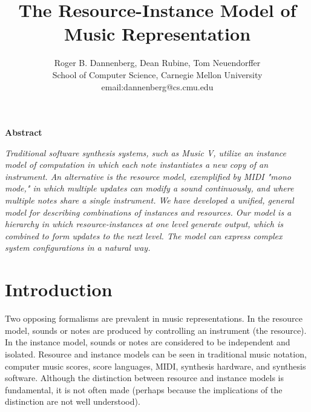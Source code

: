 \documentclass[10pt,a4paper]{article}
\begin{document}
\twocolumn

\title{\textbf{The Resource-Instance Model of Music Representation}}
\author{
Roger B. Dannenberg, Dean Rubine, Tom Neuendorffer \\
School of Computer Science, Carnegie Mellon University \\
email:dannenberg@cs.cmu.edu
}
\date{}     %
\maketitle

\pagestyle{empty}          %
\thispagestyle{empty}      %


\begin{center}
\large{\textbf{Abstract}}
\end{center}
\hspace*{-0.1in}                       %
\noindent
\textit{
Traditional software synthesis systems, such as Music V, utilize an
instance model of computation in which each note instantiates a new
copy of an instrument. An alternative is the resource model,
exemplified by MIDI "mono mode," in which multiple updates can modify
a sound continuously, and where multiple notes share a single
instrument. We have developed a unified, general model for describing
combinations of instances and resources. Our model is a hierarchy in
which resource-instances at one level generate output, which is
combined to form updates to the next level. The model can express
complex system configurations in a natural way.
}

\section{Introduction}

Two opposing formalisms are prevalent in music representations.  In
the resource model, sounds or notes are produced by controlling an
instrument (the resource).  In the instance model, sounds or notes are
considered to be independent and isolated.  Resource and instance
models can be seen in traditional music notation, computer music
scores, score languages, MIDI, synthesis hardware, and synthesis
software.  Although the distinction between resource and instance
models is fundamental, it is not often made (perhaps because the
implications of the distinction are not well understood).
\end{document}
